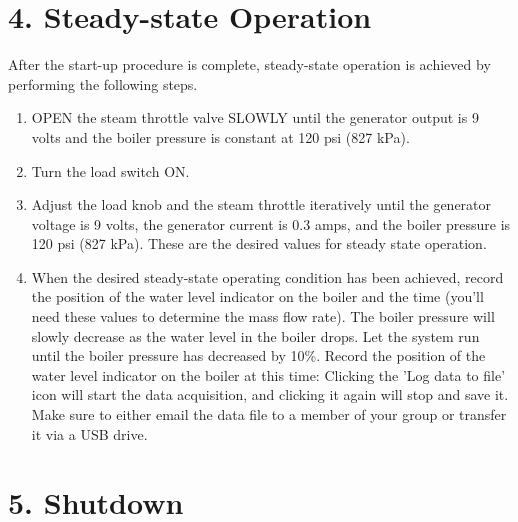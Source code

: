 \documentclass[12pt]{article}
\begin{document}
\section*{\normalsize \bf 4. Steady-state Operation}

After the start-up procedure is complete, steady-state operation is 
achieved by performing the following steps.

\begin{enumerate}  

\item OPEN the steam throttle valve SLOWLY until the generator output is
9 volts and the boiler pressure is constant at 120 psi (827 kPa).

\item Turn the load switch ON.

\item Adjust the load knob and the steam throttle iteratively
until the generator voltage is 9 volts, the generator current is
0.3 amps, and the boiler pressure is 120 psi (827 kPa).  These
are the desired values for steady state operation.

\item When the desired steady-state operating condition has been 
achieved, record the position of the water level indicator on the 
boiler and the time (you'll need these values to determine the mass flow rate).  The boiler pressure will slowly decrease as the water level 
in the boiler drops.  Let the system run until the boiler pressure
has decreased by 10\%.  Record the position of the water level indicator
on the boiler at this time: Clicking the 'Log data to file' icon will start the data acquisition, and clicking it again will stop and save it. Make sure to either email the data file to a member of your group or transfer it via a USB drive.

\end{enumerate}

\section*{\normalsize \bf 5. Shutdown}
\end{document}
